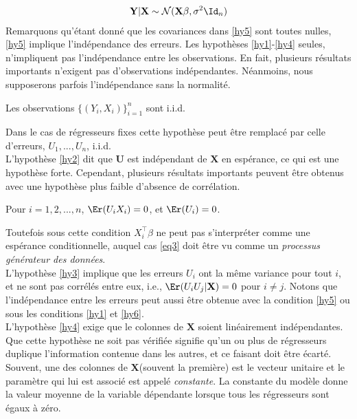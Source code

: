 \begin{align*}
\mathbf{Y}|\mathbf{X} \sim\mathcal{N}(\mathbf{X}\beta, \sigma^2\Id_n)
\end{align*}
Remarquons qu'étant donné que les covariances dans \ref{hy5} sont toutes nulles,  \ref{hy5} implique l'indépendance des erreurs. Les hypothèses \ref{hy1}-\ref{hy4} seules, n'impliquent pas l'indépendance entre les observations. En fait, plusieurs résultats importants n'exigent pas d'observations indépendantes. Néanmoins, nous supposerons parfois l'indépendance  sans la normalité.
\begin{hypothese}
Les observations $\{(Y_i, X_i)\}_{i=1}^n$ sont i.i.d.
\label{hy6}
\end{hypothese}
Dans le cas de régresseurs fixes cette hypothèse peut être remplacé par celle d'erreurs, $U_1, ..., U_n$, i.i.d.\\
L'hypothèse \ref{hy2} dit que $\mathbf{U}$ est indépendant de $\mathbf{X}$ en espérance, ce qui est une hypothèse forte. Cependant, plusieurs résultats importants peuvent être obtenus avec une hypothèse plus faible  d'absence de corrélation.
\begin{hypothese}
Pour $i=1,2,...,n$, $\Er(U_iX_i)=0$, et $\Er(U_i)=0$.
\label{hy7}
\end{hypothese}
Toutefois sous cette condition $X_i^\top\beta$ ne peut pas s'interpréter comme une espérance conditionnelle, auquel cas \eqref{eq3} doit être vu comme un \emph{processus générateur des données}.\\
L'hypothèse \ref{hy3} implique que les erreurs $U_i$ ont la même variance pour tout $i$, et ne sont pas corrélés entre eux, i.e., $\Er(U_iU_j| \mathbf{X}) = 0$ pour $i\neq j$. Notons que l'indépendance entre les erreurs peut aussi être obtenue avec la condition \ref{hy5} ou sous les  conditions \ref{hy1} et \ref{hy6}.\\
L'hypothèse \ref{hy4} exige que le colonnes de $\mathbf{X}$ soient linéairement indépendantes. Que cette hypothèse ne soit pas vérifiée signifie qu'un ou plus de régresseurs duplique l'information contenue dans les autres, et ce faisant doit être écarté.\\
Souvent, une des colonnes de $\mathbf{X}$(souvent la première) est le vecteur unitaire et le paramètre qui lui est associé est appelé \emph{constante}. La constante du modèle donne la valeur moyenne de la variable dépendante lorsque tous les régresseurs sont égaux à zéro.

